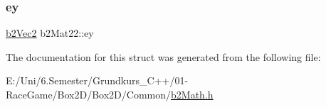 \mbox{\label{structb2_mat22_af19db58941d2cd146325ef3191b776fd}} 
\subsubsection{\texorpdfstring{ey}{ey}}
{\footnotesize\ttfamily \mbox{\hyperlink{structb2_vec2}{b2\+Vec2}} b2\+Mat22\+::ey}



The documentation for this struct was generated from the following file\+:\begin{DoxyCompactItemize}
\item 
E\+:/\+Uni/6.\+Semester/\+Grundkurs\+\_\+\+C++/01-\/\+Race\+Game/\+Box2\+D/\+Box2\+D/\+Common/\mbox{\hyperlink{b2_math_8h}{b2\+Math.\+h}}\end{DoxyCompactItemize}
